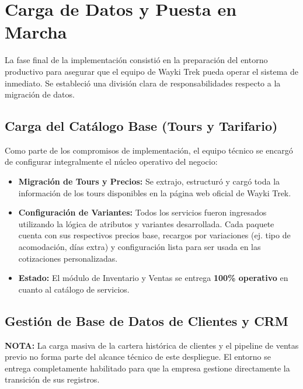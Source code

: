 \section{Carga de Datos y Puesta en Marcha}

La fase final de la implementación consistió en la preparación del entorno productivo para asegurar que el equipo de Wayki Trek pueda operar el sistema de inmediato. Se estableció una división clara de responsabilidades respecto a la migración de datos.

\subsection{Carga del Catálogo Base (Tours y Tarifario)}
Como parte de los compromisos de implementación, el equipo técnico se encargó de configurar integralmente el núcleo operativo del negocio:
\begin{itemize}[leftmargin=*]
    \item \textbf{Migración de Tours y Precios:} Se extrajo, estructuró y cargó toda la información de los tours disponibles en la página web oficial de Wayki Trek.
    \item \textbf{Configuración de Variantes:} Todos los servicios fueron ingresados utilizando la lógica de atributos y variantes desarrollada. Cada paquete cuenta con sus respectivos precios base, recargos por variaciones (ej. tipo de acomodación, días extra) y configuración lista para ser usada en las cotizaciones personalizadas.
    \item \textbf{Estado:} El módulo de Inventario y Ventas se entrega \textbf{100\% operativo} en cuanto al catálogo de servicios.
\end{itemize}

\subsection{Gestión de Base de Datos de Clientes y CRM}
\begin{tcolorbox}[enhanced, attach boxed title to top center={yshift=-3mm,yshifttext=-1mm},
  colback=orange!5!white,colframe=orange!75!black,colbacktitle=orange!80!black,
  title=Aclaración sobre Datos Históricos,fonttitle=\bfseries,
  boxed title style={size=small,colframe=orange!50!black} ]
  \textbf{NOTA:} La carga masiva de la cartera histórica de clientes y el pipeline de ventas previo no forma parte del alcance técnico de este despliegue. El entorno se entrega completamente habilitado para que la empresa gestione directamente la transición de sus registros.
\end{tcolorbox}

